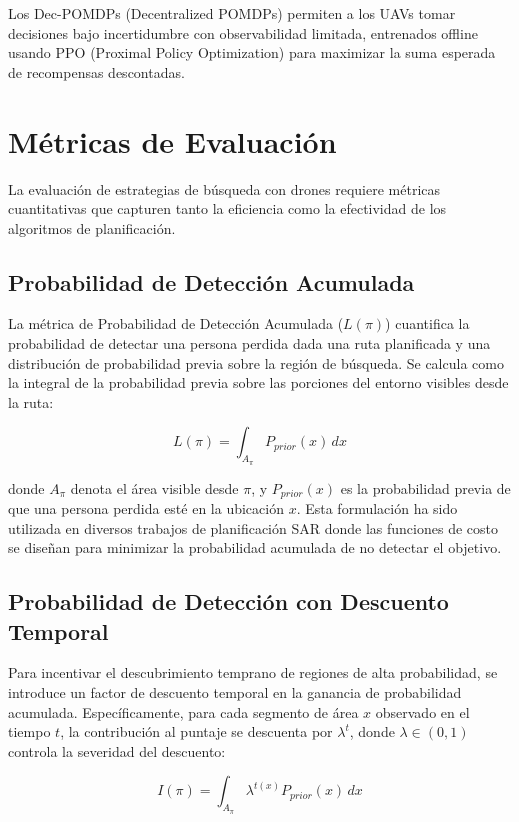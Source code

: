 \documentclass[12pt]{report} %
\begin{document}
Los Dec-POMDPs (Decentralized POMDPs) permiten a los UAVs tomar decisiones bajo incertidumbre con observabilidad limitada, entrenados offline usando PPO (Proximal Policy Optimization) para maximizar la suma esperada de recompensas descontadas.

\chapter{Métricas de Evaluación}

La evaluación de estrategias de búsqueda con drones requiere métricas cuantitativas que capturen tanto la eficiencia como la efectividad de los algoritmos de planificación.

\section{Probabilidad de Detección Acumulada}

La métrica de Probabilidad de Detección Acumulada ($L(\pi)$) cuantifica la probabilidad de detectar una persona perdida dada una ruta planificada y una distribución de probabilidad previa sobre la región de búsqueda. Se calcula como la integral de la probabilidad previa sobre las porciones del entorno visibles desde la ruta:

\begin{equation}
L(\pi) = \int_{A_\pi} P_{prior}(x) \, dx
\end{equation}

donde $A_\pi$ denota el área visible desde $\pi$, y $P_{prior}(x)$ es la probabilidad previa de que una persona perdida esté en la ubicación $x$. Esta formulación ha sido utilizada en diversos trabajos de planificación SAR donde las funciones de costo se diseñan para minimizar la probabilidad acumulada de no detectar el objetivo\cite{li2020}.

\section{Probabilidad de Detección con Descuento Temporal}

Para incentivar el descubrimiento temprano de regiones de alta probabilidad, se introduce un factor de descuento temporal en la ganancia de probabilidad acumulada. Específicamente, para cada segmento de área $x$ observado en el tiempo $t$, la contribución al puntaje se descuenta por $\lambda^t$, donde $\lambda \in (0,1)$ controla la severidad del descuento:

\begin{equation}
I(\pi) = \int_{A_\pi} \lambda^{t(x)} P_{prior}(x) \, dx
\end{equation}
\end{document}

